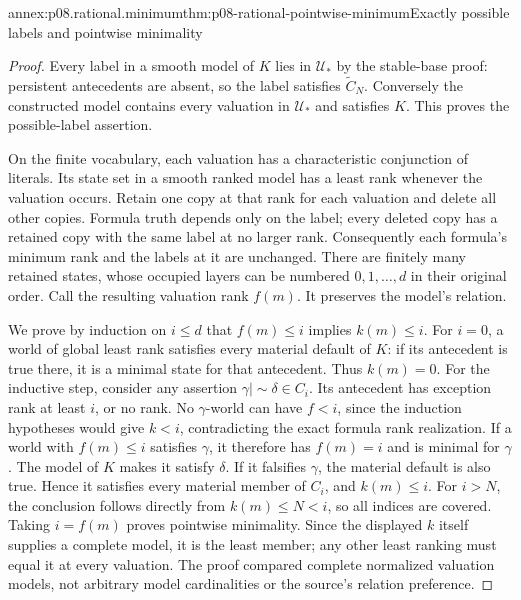\begin{annexitem}{annex:p08.rational.minimum}{thm:p08-rational-pointwise-minimum}{Exactly possible labels and pointwise minimality}
\begin{proof}
Every label in a smooth model of \(K\) lies in \(\mathcal U_*\)
by the stable-base proof: persistent antecedents are absent, so the
label satisfies \(\widetilde C_N\). Conversely the constructed
model contains every valuation in \(\mathcal U_*\) and satisfies
\(K\). This proves the possible-label assertion.

On the finite vocabulary, each valuation has a characteristic
conjunction of literals. Its state set in a smooth ranked model has
a least rank whenever the valuation occurs. Retain one copy at that
rank for each valuation and delete all other copies. Formula truth
depends only on the label; every deleted copy has a retained copy
with the same label at no larger rank. Consequently each formula's
minimum rank and the labels at it are unchanged. There are finitely
many retained states, whose occupied layers can be numbered
\(0,1,\ldots,d\) in their original order. Call the resulting
valuation rank \(f(m)\). It preserves the model's relation.

We prove by induction on \(i\leq d\) that
\(f(m)\leq i\) implies \(k(m)\leq i\).
For \(i=0\), a world of global least rank satisfies every material
default of \(K\): if its antecedent is true there, it is a minimal
state for that antecedent. Thus \(k(m)=0\).
For the inductive step, consider any assertion
\(\gamma\mathrel{|\!\sim}\delta\in C_i\).
Its antecedent has exception rank at least \(i\), or no rank.
No \(\gamma\)-world can have \(f<i\), since the induction
hypotheses would give \(k<i\), contradicting the exact formula
rank realization. If a world with \(f(m)\leq i\) satisfies
\(\gamma\), it therefore has \(f(m)=i\) and is minimal for
\(\gamma\). The model of \(K\) makes it satisfy \(\delta\).
If it falsifies \(\gamma\), the material default is also true.
Hence it satisfies every material member of \(C_i\), and
\(k(m)\leq i\). For \(i>N\), the conclusion follows directly
from \(k(m)\leq N<i\), so all indices are covered.
Taking \(i=f(m)\) proves pointwise minimality.
Since the displayed \(k\) itself supplies a complete model, it is
the least member; any other least ranking must equal it at every
valuation. The proof compared complete normalized valuation models,
not arbitrary model cardinalities or the source's relation preference.
\end{proof}
\end{annexitem}

